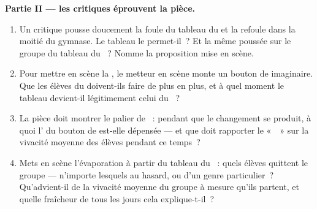 \begin{problem}
\medskip\noindent\textbf{Partie II --- les critiques éprouvent la
pièce.}
\begin{enumerate}[resume]
  \item Un critique pousse doucement la foule du tableau du  et
        la refoule dans la moitié du gymnase. Le tableau le
        permet-il~? Et la même poussée sur le groupe du tableau du
        ~? Nomme la proposition mise en scène.
  \item Pour mettre en scène la \emph{}, le metteur en scène
        monte un bouton de  imaginaire. Que les élèves du
         doivent-ils faire de plus en plus, et à quel moment
        le tableau devient-il légitimement celui du ~?
  \item La pièce doit montrer le palier de ~: pendant que le
        changement se produit, à quoi l' du bouton de
         est-elle dépensée --- et que doit rapporter le
        «~~» sur la vivacité moyenne des
        élèves pendant ce temps~?
  \item Mets en scène l'évaporation à partir du tableau du
        ~: quels élèves quittent le groupe --- n'importe
        lesquels au hasard, ou d'un genre particulier~? Qu'advient-il
        de la vivacité moyenne du groupe à mesure qu'ils partent, et
        quelle fraîcheur de tous les jours cela explique-t-il~?
\end{enumerate}


\end{problem}

